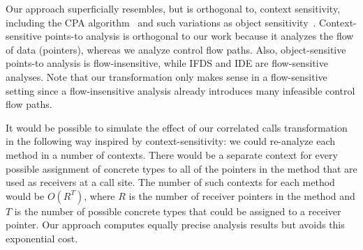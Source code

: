 Our approach superficially resembles, but is orthogonal to, context
sensitivity, including the CPA algorithm~\cite{Agesen:95} and such variations as object sensitivity~\cite{DBLP:journals/tosem/MilanovaRR05}.
Context-sensitive
points-to analysis is orthogonal to our work because it analyzes the
flow of data (pointers), whereas we analyze control flow paths.
Also, object-sensitive points-to analysis is flow-insensitive, while
IFDS and IDE are flow-sensitive analyses. Note that our transformation only makes sense
in a flow-sensitive setting since a flow-insensitive analysis already
introduces many infeasible control flow paths.

It would be possible to simulate the effect of our correlated calls
transformation in the following way inspired by context-sensitivity:
we could re-analyze each method in a number
of contexts. There would be a separate context for every possible
assignment of concrete types to all of the pointers in the method that
are used as receivers at a call site. The number of such contexts for
each method would be $O(R^T)$, where $R$ is the number of receiver pointers
in the method and $T$ is the number of possible concrete types that could
be assigned to a receiver pointer. Our approach computes equally precise
analysis results but avoids this exponential cost.

